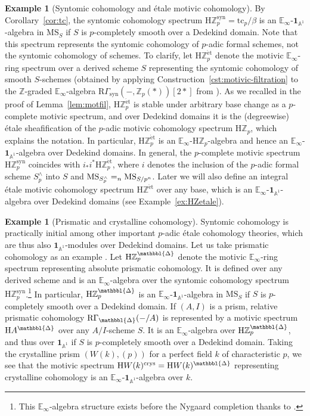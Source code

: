 \documentclass{amsart}
\numberwithin{equation}{section}
\theoremstyle{plain}
\theoremstyle{definition}
\newtheorem{example}[equation]{Example}
\let\bb=\mathbb
\def\Z{\bb Z}
\def\A{\bb A}
\def\1{\mathbf 1}
\def\ph{\mathord-}
\def\HH{\mathrm{H}}
\def\E{\mathbb{E}}
\def\et{\mathrm{\acute et}}
\def\MS{\mathrm{MS}}
\newcommand{\crys}{\mathrm{crys}}
\newcommand{\syn}{\mathrm{syn}}
\newcommand{\tc}{\mathrm{tc}}
\newcommand{\prism}{{\mathbbl{\Delta}}}
\let\lim=\relax
\DeclareMathOperator*{\lim}{lim}
\begin{document}
\begin{example}[Syntomic cohomology and étale motivic cohomology]
	\label{ex:syn}
By Corollary~\ref{cor:tc}, the syntomic cohomology spectrum $\HH\Z_p^\syn=\tc_p/\beta$ is an $\E_\infty$-$\1_{\A^1}$-algebra in $\MS_S$ if $S$ is $p$-completely smooth over a Dedekind domain.
Note that this spectrum represents the syntomic cohomology of $p$-adic formal schemes, not the syntomic cohomology of schemes.
To clarify, let $\HH\Z_p^\et$ denote the motivic $\E_\infty$-ring spectrum over a derived scheme $S$ representing the syntomic cohomology of smooth $S$-schemes (obtained by applying Construction~\ref{cst:motivic-filtration} to the $\Z$-graded $\E_\infty$-algebra $\mathrm{R}\Gamma_\syn(\ph,\Z_p(*))[2*]$ from \cite[Section 8.4]{BhattLurie}). As we recalled in the proof of Lemma~\ref{lem:motfil}, $\HH\Z_p^\et$ is stable under arbitrary base change as a $p$-complete motivic spectrum, and over Dedekind domains it is the (degreewise) étale sheafification of the $p$-adic motivic cohomology spectrum $\HH\Z_p$, which explains the notation.
In particular, $\HH\Z_p^\et$ is an $\E_\infty$-$\HH\Z_p$-algebra and hence an $\E_\infty$-$\1_{\A^1}$-algebra over Dedekind domains.
In general, the $p$-complete motivic spectrum $\HH\Z_p^\syn$ coincides with $i_*i^*\HH\Z_p^\et$, where $i$ denotes the inclusion of the $p$-adic formal scheme $S^\wedge_p$ into $S$ and $\MS_{S^\wedge_p}=\lim_n \MS_{S/p^n}$.
Later we will also define an integral étale motivic cohomology spectrum $\HH\Z^\et$ over any base, which is an $\E_\infty$-$\1_{\A^1}$-algebra over Dedekind domains (see Example~\ref{ex:HZetale}).
\end{example}

\begin{example}[Prismatic and crystalline cohomology]
	\label{ex:prism}
Syntomic cohomology is practically initial among other important $p$-adic étale cohomology theories, which are thus also $\1_{\A^1}$-modules over Dedekind domains.
Let us take prismatic cohomology as an example \cite{BS:2022,BhattLurie,AKN}.
Let $\HH\Z_p^\prism$ denote the motivic $\E_\infty$-ring spectrum representing absolute prismatic cohomology.
It is defined over any derived scheme and is an $\E_\infty$-algebra over the syntomic cohomology spectrum $\HH\Z_p^\syn$.\footnote{This $\E_\infty$-algebra structure exists before the Nygaard completion thanks to \cite[Proposition~7.12]{AKN}.}
In particular, $\HH\Z_p^\prism$ is an $\E_\infty$-$\1_{\A^1}$-algebra in $\MS_S$ if $S$ is $p$-completely smooth over a Dedekind domain.
If $(A,I)$ is a prism, relative prismatic cohomology $\mathrm{R}\Gamma_\prism(\ph/A)$ is represented by a motivic spectrum $\HH A^\prism$ over any $A/I$-scheme $S$.
It is an $\E_\infty$-algebra over $\HH\Z_p^\prism$, and thus over $\1_{\A^1}$ if $S$ is $p$-completely smooth over a Dedekind domain.
Taking the crystalline prism $(W(k),(p))$ for a perfect field $k$ of characteristic $p$, we see that the motivic spectrum $\HH W(k)^\crys=\HH W(k)^\prism$ representing crystalline cohomology is an $\E_\infty$-$\1_{\A^1}$-algebra over $k$.
\end{example}
\end{document}

